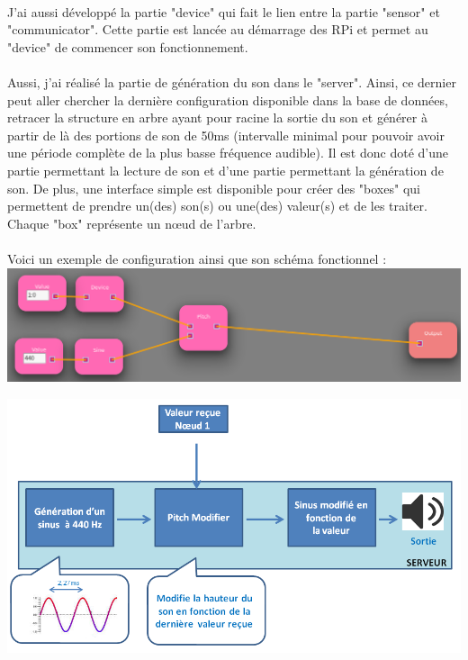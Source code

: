 \documentclass[12pt]{article}
\begin{document}
	\paragraph{}
	J'ai aussi développé la partie "device" qui fait le lien entre la partie "sensor" et "communicator". Cette partie est lancée au démarrage des RPi et permet au "device" de commencer son fonctionnement.
	
	\paragraph{}
	Aussi, j'ai réalisé la partie de génération du son dans le "server". Ainsi, ce dernier peut aller chercher la dernière configuration disponible dans la base de données, retracer la structure en arbre ayant pour racine la sortie du son et générer à partir de là des portions de son de 50ms (intervalle minimal pour pouvoir avoir une période complète de la plus basse fréquence audible). Il est donc doté d'une partie permettant la lecture de son et d'une partie permettant la génération de son. De plus, une interface simple est disponible pour créer des "boxes" qui permettent de prendre un(des) son(s) ou une(des) valeur(s) et de les traiter. Chaque "box" représente un nœud de l'arbre.
	
	\paragraph{}
	Voici un exemple de configuration ainsi que son schéma fonctionnel :\\
	
	\vspace{1cm}
	\noindent
	\includegraphics[width=\textwidth]{config_sheme}
	
	\vspace{1cm}
	\noindent
	\includegraphics[width=\textwidth]{config_example}
	\vspace{1cm}
	
\end{document}
